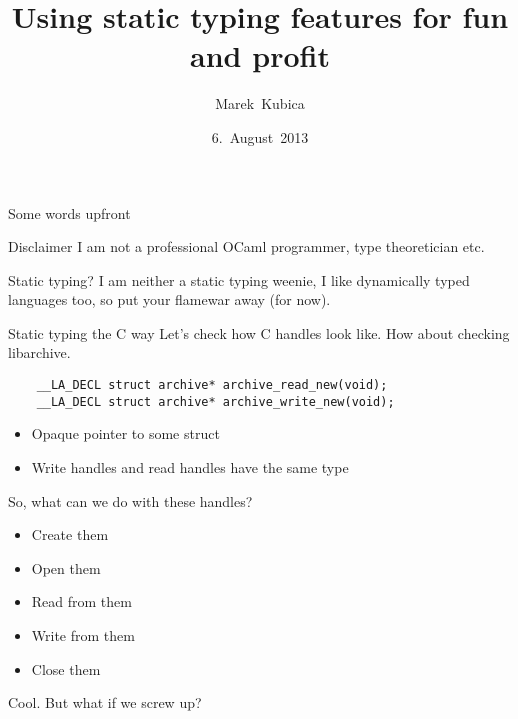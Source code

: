 \documentclass{beamer}
\title{Using static typing features for fun and profit}
\author{Marek~Kubica}
\date{6.~August~2013}
\institute{Lambda Munich}
\begin{document}



\begin{frame}{Some words upfront}
  \begin{alertblock}{Disclaimer}
    I am not a professional OCaml programmer, type theoretician etc.
  \end{alertblock}
  \pause
  \begin{alertblock}{Static typing?}
    I am neither a static typing weenie, I like dynamically typed languages
    too, so put your flamewar away (for now).
  \end{alertblock}
\end{frame}

\begin{frame}[fragile]{Static typing the C way}
  Let's check how C handles look like. How about checking libarchive.
  \begin{verbatim}
    __LA_DECL struct archive* archive_read_new(void);
    __LA_DECL struct archive* archive_write_new(void);
  \end{verbatim}
  \begin{itemize}
    \item Opaque pointer to some struct
    \item Write handles and read handles have the same type
  \end{itemize}
\end{frame}

\begin{frame}
  So, what can we do with these handles?
  \pause
  \begin{itemize}
    \item Create them
    \item Open them
    \item Read from them
    \item Write from them
    \item Close them
  \end{itemize}
  \pause
  Cool.
  \pause
  \alert{But what if we screw up?}
\end{frame}
\end{document}
